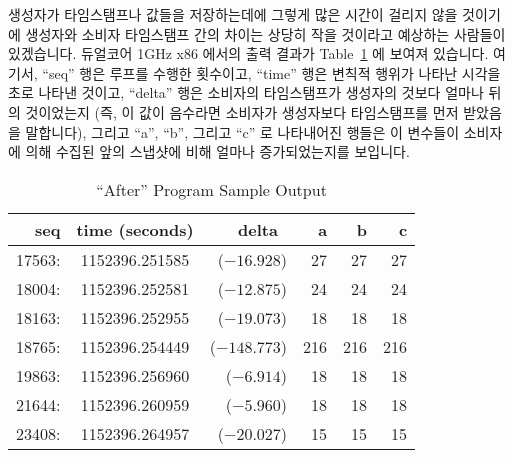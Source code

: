 생성자가 타임스탬프나 값들을 저장하는데에 그렇게 많은 시간이 걸리지 않을
것이기에 생성자와 소비자 타임스탬프 간의 차이는 상당히 작을 것이라고 예상하는
사람들이 있겠습니다.
듀얼코어 1GHz x86 에서의 출력 결과가
Table~\ref{tab:app:questions:After Program Sample Output} 에 보여져 있습니다.
여기서, ``seq'' 행은 루프를 수행한 횟수이고, ``time'' 행은 변칙적 행위가 나타난
시각을 초로 나타낸 것이고, ``delta'' 행은 소비자의 타임스탬프가 생성자의 것보다
얼마나 뒤의 것이었는지 (즉, 이 값이 음수라면 소비자가 생성자보다 타임스탬프를
먼저 받았음을 말합니다), 그리고 ``a'', ``b'', 그리고 ``c'' 로 나타내어진 행들은
이 변수들이 소비자에 의해 수집된 앞의 스냅샷에 비해 얼마나 증가되었는지를
보입니다.
\iffalse

One might intuitively expect that the difference between the producer
and consumer timestamps would be quite small, as it should not take
much time for the producer to record the timestamps or the values.
An excerpt of some sample output on a dual-core 1GHz x86 is shown in
Table~\ref{tab:app:questions:After Program Sample Output}.
Here, the ``seq'' column is the number of times through the loop,
the ``time'' column is the time of the anomaly in seconds, the ``delta''
column is the number of seconds the consumer's timestamp follows that
of the producer (where a negative value indicates that the consumer
has collected its timestamp before the producer did), and the
columns labelled ``a'', ``b'', and ``c'' show the amount that these
variables increased since the prior snapshot collected by the consumer.
\fi

\begin{table}[htbp]
\centering
\scriptsize
\begin{tabular}{rcrrrr}
seq    & time (seconds) & delta~    &  a &  b &  c \\
\hline
17563: & 1152396.251585 & ($-16.928$) & 27 & 27 & 27 \\
18004: & 1152396.252581 & ($-12.875$) & 24 & 24 & 24 \\
18163: & 1152396.252955 & ($-19.073$) & 18 & 18 & 18 \\
18765: & 1152396.254449 & ($-148.773$) & 216 & 216 & 216 \\
19863: & 1152396.256960 & ($-6.914$) & 18 & 18 & 18 \\
21644: & 1152396.260959 & ($-5.960$) & 18 & 18 & 18 \\
23408: & 1152396.264957 & ($-20.027$) & 15 & 15 & 15 \\
\end{tabular}
\caption{``After'' Program Sample Output}
\label{tab:app:questions:After Program Sample Output}
\end{table}

